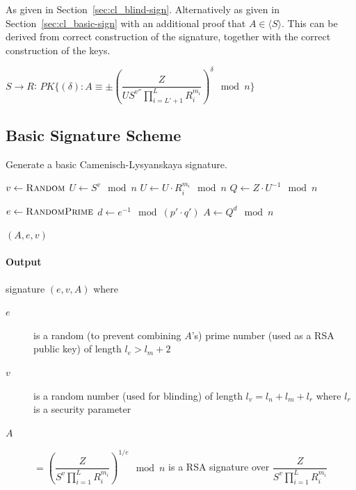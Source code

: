 As given in Section~\ref{sec:cl_blind-sign}. Alternatively as given in Section~\ref{sec:cl_basic-sign} with an additional proof that $A \in \langle S \rangle$. This can be derived from correct construction of the signature, together with the correct construction of the keys.

$S \longrightarrow R$: $PK\{(\delta) : A \equiv \pm \left(\dfrac{Z}{U S^{v''} \prod_{i=L'+1}^{L} R_i^{m_i}} \right)^{\delta} \mod n \}$


\subsection{Basic Signature Scheme}\label{sec:cl_basic}

\begin{algorithm}[t]
  \caption{Generate a basic Camenisch-Lysyanskaya signature.}
  \label{alg:CL-sign}
  \addtolength{\baselineskip}{1mm}
  \begin{algorithmic}[1]
      \State $v \gets \Call{Random}{}$
      \State $U \gets S^v \mod n$
        \State $U \gets U \cdot R_i^{m_i} \mod n$
      \EndFor
      \State $Q \gets Z \cdot U^{-1} \mod n$

      \State $e \gets \Call{RandomPrime}{}$
      \State $d \gets e^{-1} \mod (p' \cdot q')$
      \State $A \gets Q^d \mod n$

      \Return $(A, e, v)$
    \EndFunction
  \end{algorithmic}
\end{algorithm}

\paragraph{Output} signature $(e, v, A)$ where
\begin{description}
  \item[$e$] is a random (to prevent combining $A$'s) prime number (used as a RSA public key) of length $l_e > l_m + 2$
  \item[$v$] is a random number (used for blinding) of length $l_v = l_n + l_m + l_r$ where $l_r$ is a security parameter
  \item[$A$] $=\left(\dfrac{Z}{S^v \prod_{i=1}^{L} R_i^{m_i}} \right)^{1/e} \mod n$ is a RSA signature over $\dfrac{Z}{S^v \prod_{i=1}^{L} R_i^{m_i}}$
\end{description}

